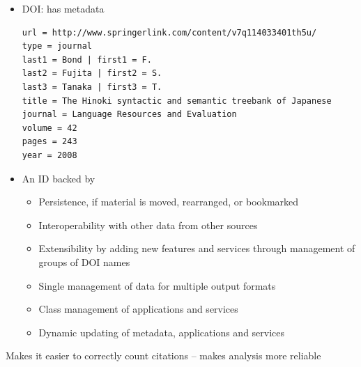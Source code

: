 \documentclass[a4paper,landscape,headrule,footrule,xetex]{foils}
\begin{document}

\begin{itemize}
\item DOI:  has metadata
\begin{verbatim}
url = http://www.springerlink.com/content/v7q114033401th5u/
type = journal 
last1 = Bond | first1 = F. 
last2 = Fujita | first2 = S. 
last3 = Tanaka | first3 = T. 
title = The Hinoki syntactic and semantic treebank of Japanese 
journal = Language Resources and Evaluation 
volume = 42 
pages = 243 
year = 2008 
\end{verbatim}
\end{itemize}


\begin{itemize}
\item An ID backed by 
\begin{itemize}
\item Persistence, if material is moved, rearranged, or bookmarked
\item Interoperability with other data from other sources
\item Extensibility by adding new features and services through management of groups of DOI names
\item Single management of data for multiple output formats
\item Class management of applications and services
\item Dynamic updating of metadata, applications and services
\end{itemize}
\end{itemize}

Makes it easier to correctly count citations -- makes analysis more reliable




\end{document}
